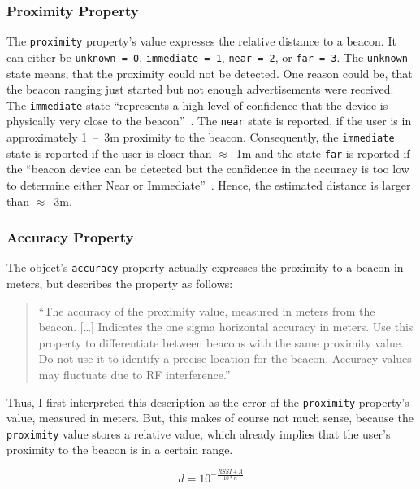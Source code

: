 \subsubsection*{Proximity Property}
The \texttt{proximity} property's value expresses the relative distance to a beacon. It can either be \texttt{unknown = 0}, \texttt{immediate = 1}, \texttt{near = 2}, or \texttt{far = 3}. The \texttt{unknown} state means, that the proximity could not be detected. One reason could be, that the beacon ranging just started but not enough advertisements were received. The \texttt{immediate} state ``represents a high level of confidence that the device is physically very close to the beacon''~\citep{apple:getting_started}. The \texttt{near} state is reported, if the user is in approximately 1~--~3m proximity to the beacon. Consequently, the \texttt{immediate} state is reported if the user is closer than $\approx$~1m and the state \texttt{far} is reported if the ``beacon device can be detected but the confidence in the accuracy is too low to determine either Near or Immediate''~\citep{apple:getting_started}. Hence, the estimated distance is larger than $\approx$~3m.

\subsubsection*{Accuracy Property}
The object's \texttt{accuracy} property actually expresses the proximity to a beacon in meters, but \citet{apple:ios_doc_cl} describes the property as follows:
\begin{quote}
  ``The accuracy of the proximity value, measured in meters from the beacon.
  [\dots]
  Indicates the one sigma horizontal accuracy in meters. Use this property to differentiate between beacons with the same proximity value. Do not use it to identify a precise location for the beacon. Accuracy values may fluctuate due to RF interference.''\citep{apple:ios_doc_cl}
\end{quote}
Thus, I first interpreted this description as the error of the \texttt{proximity} property's value, measured in meters. But, this makes of course not much sense, because the \texttt{proximity} value stores a relative value, which already implies that the user's proximity to the beacon is in a certain range.

\begin{equation} \label{eq:rssiToDistanceCalc}
	d = 10^{-\frac{RSSI + A}{10 * n}}
\end{equation}

